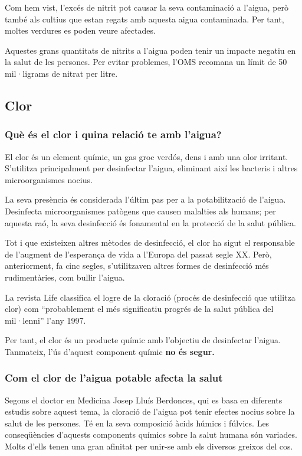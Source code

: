 Com hem vist, l'excés de nitrit pot causar la seva contaminació a l'aigua, però també als cultius que estan regats amb aquesta aigua contaminada. Per tant, moltes verdures es poden veure afectades.

Aquestes grans quantitats de nitrits a l'aigua poden tenir un impacte negatiu en la salut de les persones. Per evitar problemes, l'OMS recomana un límit de 50 mil·ligrams de nitrat per litre. \cite{OMS}
\subsection{Clor} \label{subsec:clor}
\subsubsection{Què és el clor i quina relació te amb l'aigua?}
El clor és un element químic, un gas groc verdós, dens i amb una olor irritant. S'utilitza principalment per desinfectar l'aigua, eliminant així les bacteris i altres microorganismes nocius.

La seva presència és considerada l'últim pas per a la potabilització de l'aigua. Desinfecta microorganismes patògens que causen malalties als humans; per aquesta raó, la seva desinfecció és fonamental en la protecció de la salut pública.

Tot i que existeixen altres mètodes de desinfecció, el clor ha sigut el responsable de l'augment de l'esperança de vida a l'Europa del passat segle XX. Però, anteriorment, fa cinc segles, s'utilitzaven altres formes de desinfecció més rudimentàries, com bullir l'aigua.

La revista Life \cite{RevistaLife} classifica el logre de la cloració (procés de desinfecció que utilitza clor) com “probablement el més significatiu progrés de la salut pública del mil·lenni” l'any 1997.

Per tant, el clor és un producte químic amb l'objectiu de desinfectar l'aigua. Tanmateix, l'ús d'aquest component químic \textbf{no és segur.}
\subsubsection{Com el clor de l'aigua potable afecta la salut}
Segons el doctor en Medicina Josep Lluís Berdonces, qui es basa en diferents estudis sobre aquest tema, la cloració de l’aigua pot tenir efectes nocius sobre la salut de les persones. Té en la seva composició àcids húmics i fúlvics. Les conseqüències d’aquests components químics sobre la salut humana són variades. Molts d’ells tenen una gran afinitat per unir-se amb els diversos greixos del cos. \cite{Clor}
